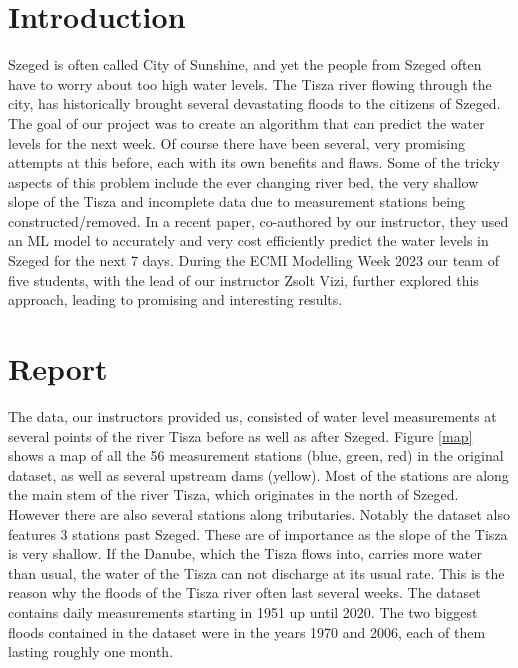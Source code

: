 \documentclass{article}
\begin{document}
\section{Introduction}

Szeged is often called City of Sunshine, and yet the people from Szeged often
have to worry about too high water levels. The Tisza river flowing through the
city, has historically brought several devastating floods to the citizens of
Szeged. The goal of our project was to create an algorithm that can predict
the water levels for the next week. Of course there have been several, very
promising attempts at this before, each with its own benefits and flaws. Some
of the tricky aspects of this problem include the ever changing river bed, the
very shallow slope of the Tisza and incomplete data due to measurement
stations being constructed/removed. In a recent paper{\cite{WaterLevel2023}},
co-authored by our instructor, they used an ML model to accurately and very
cost efficiently predict the water levels in Szeged for the next 7 days.
During the ECMI Modelling Week 2023 our team of five students, with the lead
of our instructor Zsolt Vizi, further explored this approach, leading to
promising and interesting results.

\section{Report}

The data, our instructors provided us, consisted of water level measurements
at several points of the river Tisza before as well as after Szeged. Figure
\ref{map} shows a map of all the 56 measurement stations (blue, green, red) in
the original dataset, as well as several upstream dams (yellow). Most of the
stations are along the main stem of the river Tisza, which originates in the
north of Szeged. However there are also several stations along tributaries.
Notably the dataset also features 3 stations past Szeged. These are of
importance as the slope of the Tisza is very shallow. If the Danube, which the
Tisza flows into, carries more water than usual, the water of the Tisza can
not discharge at its usual rate. This is the reason why the floods of the
Tisza river often last several weeks. The dataset contains daily measurements
starting in 1951 up until 2020. The two biggest floods contained in the
dataset were in the years 1970 and 2006, each of them lasting roughly one
month.

\
\end{document}
